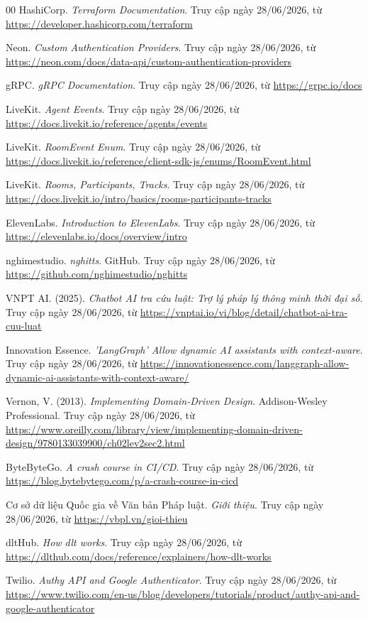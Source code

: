 \begin{thebibliography}{00}
HashiCorp. \textit{Terraform Documentation}. Truy cập ngày 28/06/2026, từ \url{https://developer.hashicorp.com/terraform}

Neon. \textit{Custom Authentication Providers}. Truy cập ngày 28/06/2026, từ \url{https://neon.com/docs/data-api/custom-authentication-providers}

gRPC. \textit{gRPC Documentation}. Truy cập ngày 28/06/2026, từ \url{https://grpc.io/docs}

LiveKit. \textit{Agent Events}. Truy cập ngày 28/06/2026, từ \url{https://docs.livekit.io/reference/agents/events}

LiveKit. \textit{RoomEvent Enum}. Truy cập ngày 28/06/2026, từ \url{https://docs.livekit.io/reference/client-sdk-js/enums/RoomEvent.html}

LiveKit. \textit{Rooms, Participants, Tracks}. Truy cập ngày 28/06/2026, từ \url{https://docs.livekit.io/intro/basics/rooms-participants-tracks}

ElevenLabs. \textit{Introduction to ElevenLabs}. Truy cập ngày 28/06/2026, từ \url{https://elevenlabs.io/docs/overview/intro}

nghimestudio. \textit{nghitts}. GitHub. Truy cập ngày 28/06/2026, từ \url{https://github.com/nghimestudio/nghitts}

VNPT AI. (2025). \textit{Chatbot AI tra cứu luật: Trợ lý pháp lý thông minh thời đại số}. Truy cập ngày 28/06/2026, từ \url{https://vnptai.io/vi/blog/detail/chatbot-ai-tra-cuu-luat}

Innovation Essence. \textit{'LangGraph' Allow dynamic AI assistants with context-aware}. Truy cập ngày 28/06/2026, từ \url{https://innovationessence.com/langgraph-allow-dynamic-ai-assistants-with-context-aware/}

Vernon, V. (2013). \textit{Implementing Domain-Driven Design}. Addison-Wesley Professional. Truy cập ngày 28/06/2026, từ \url{https://www.oreilly.com/library/view/implementing-domain-driven-design/9780133039900/ch02lev2sec2.html}

ByteByteGo. \textit{A crash course in CI/CD}. Truy cập ngày 28/06/2026, từ \url{https://blog.bytebytego.com/p/a-crash-course-in-cicd}

Cơ sở dữ liệu Quốc gia về Văn bản Pháp luật. \textit{Giới thiệu}. Truy cập ngày 28/06/2026, từ \url{https://vbpl.vn/gioi-thieu}

dltHub. \textit{How dlt works}. Truy cập ngày 28/06/2026, từ \url{https://dlthub.com/docs/reference/explainers/how-dlt-works}

Twilio. \textit{Authy API and Google Authenticator}. Truy cập ngày 28/06/2026, từ \url{https://www.twilio.com/en-us/blog/developers/tutorials/product/authy-api-and-google-authenticator}

\end{thebibliography}
\endgroup

\newpage
